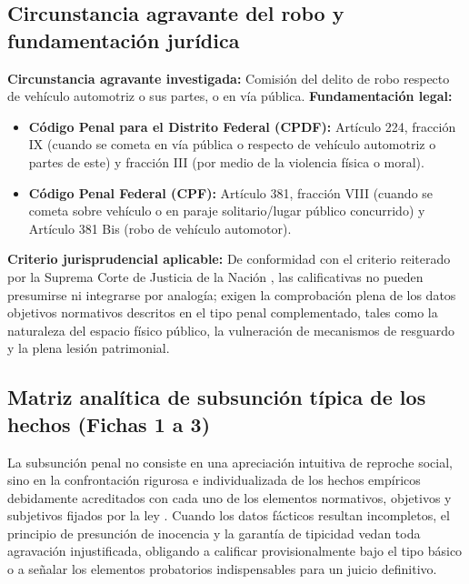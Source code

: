 \documentclass[spanish,letterpaper,oneside]{article}
\begin{document}
\subsection{Circunstancia agravante del robo y fundamentaci\'on jur\'idica}

\begin{tcolorbox}[colback=casopapel,colframe=casoverde,arc=1mm,left=3mm,right=3mm,top=2mm,bottom=2mm]
\textbf{Circunstancia agravante investigada:} Comisi\'on del delito de robo respecto de veh\'iculo automotriz o sus partes, o en v\'ia p\'ublica.\newline
\textbf{Fundamentaci\'on legal:} 
\begin{itemize}
  \item \textbf{C\'odigo Penal para el Distrito Federal (CPDF):} Art\'iculo 224, fracci\'on IX (cuando se cometa en v\'ia p\'ublica o respecto de veh\'iculo automotriz o partes de este) y fracci\'on III (por medio de la violencia f\'isica o moral).
  \item \textbf{C\'odigo Penal Federal (CPF):} Art\'iculo 381, fracci\'on VIII (cuando se cometa sobre veh\'iculo o en paraje solitario/lugar p\'ublico concurrido) y Art\'iculo 381 Bis (robo de veh\'iculo automotor).
\end{itemize}
\textbf{Criterio jurisprudencial aplicable:} De conformidad con el criterio reiterado por la Suprema Corte de Justicia de la Naci\'on \citep{scjnRoboCalificado}, las calificativas no pueden presumirse ni integrarse por analog\'ia; exigen la comprobaci\'on plena de los datos objetivos normativos descritos en el tipo penal complementado, tales como la naturaleza del espacio f\'isico p\'ublico, la vulneraci\'on de mecanismos de resguardo y la plena lesi\'on patrimonial.
\end{tcolorbox}

\subsection{Matriz anal\'itica de subsunci\'on t\'ipica de los hechos (Fichas 1 a 3)}

La subsunci\'on penal no consiste en una apreciaci\'on intuitiva de reproche social, sino en la confrontaci\'on rigurosa e individualizada de los hechos emp\'iricos debidamente acreditados con cada uno de los elementos normativos, objetivos y subjetivos fijados por la ley \citep{pavonVasconcelos2018}. Cuando los datos f\'acticos resultan incompletos, el principio de presunci\'on de inocencia y la garant\'ia de tipicidad vedan toda agravaci\'on injustificada, obligando a calificar provisionalmente bajo el tipo b\'asico o a se\~nalar los elementos probatorios indispensables para un juicio definitivo.
\end{document}

